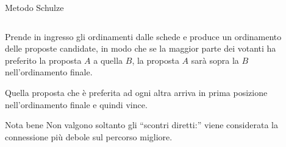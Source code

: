 \begin{frame}{Metodo Schulze}
\begin{columns}
\begin{column}{.666\textwidth}
Prende in ingresso gli ordinamenti dalle schede e produce un ordinamento delle proposte candidate, in modo che se la maggior parte dei votanti ha preferito la proposta $A$ a quella $B$, la proposta $A$ sarà sopra la $B$ nell'ordinamento finale.

\alert{Quella proposta che è preferita ad ogni altra arriva in prima posizione  nell'ordinamento finale e quindi vince}.

\begin{block}{Nota bene}
Non valgono soltanto gli ``scontri diretti:'' viene considerata la connessione più debole sul percorso migliore.
\end{block}
\end{column}
\begin{column}{.333\textwidth}
\begin{figure}[t]

\end{figure}
\end{column}
\end{columns}
\end{frame}

